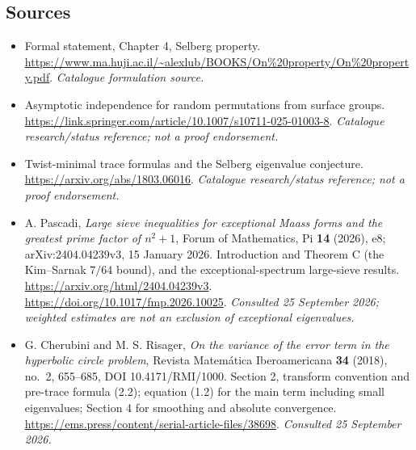\documentclass[11pt]{article}
\begin{document}
\subsection{Sources}
\begin{itemize}\raggedright
\item[\textnormal{[S1]}]\hypertarget{source:statement:1}{} Formal statement, Chapter 4, Selberg property.
\url{https://www.ma.huji.ac.il/~alexlub/BOOKS/On%20property/On%20property.pdf}.
{\small\textit{Catalogue formulation source.}}
\item[\textnormal{[S2]}]\hypertarget{source:statement:2}{} Asymptotic independence for random permutations from surface groups.
\url{https://link.springer.com/article/10.1007/s10711-025-01003-8}.
{\small\textit{Catalogue research/status reference; not a proof endorsement.}}
\item[\textnormal{[S3]}]\hypertarget{source:statement:3}{} Twist-minimal trace formulas and the Selberg eigenvalue conjecture.
\url{https://arxiv.org/abs/1803.06016}.
{\small\textit{Catalogue research/status reference; not a proof endorsement.}}
\item[\textnormal{[E1]}]\hypertarget{extra:statement:1}{}
A. Pascadi, \emph{Large sieve inequalities for exceptional Maass forms and
the greatest prime factor of $n^2+1$}, Forum of Mathematics, Pi \textbf{14}
(2026), e8; arXiv:2404.04239v3, 15 January 2026. Introduction and Theorem C
(the Kim--Sarnak $7/64$ bound), and the exceptional-spectrum large-sieve
results. \url{https://arxiv.org/html/2404.04239v3}.
\url{https://doi.org/10.1017/fmp.2026.10025}.
{\small\textit{Consulted 25 September 2026; weighted estimates are not an
exclusion of exceptional eigenvalues.}}
\item[\textnormal{[E2]}]\hypertarget{extra:statement:2}{}
G. Cherubini and M. S. Risager, \emph{On the variance of the error term in
the hyperbolic circle problem}, Revista Matem\'atica Iberoamericana
\textbf{34} (2018), no.~2, 655--685, DOI 10.4171/RMI/1000.
Section 2, transform convention and pre-trace formula (2.2); equation (1.2)
for the main term including small eigenvalues; Section 4 for smoothing and
absolute convergence.
\url{https://ems.press/content/serial-article-files/38698}.
{\small\textit{Consulted 25 September 2026.}}
\end{itemize}
\end{document}
